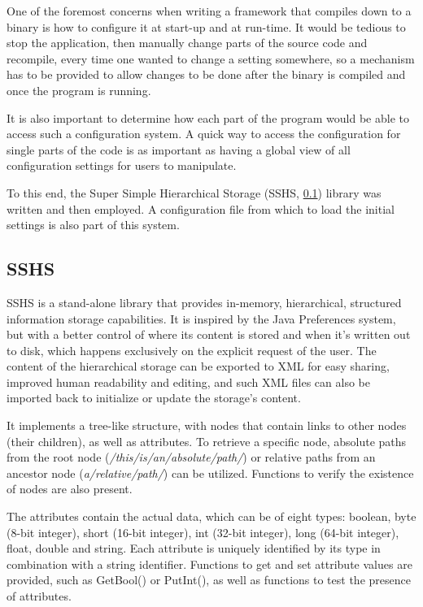 \documentclass[a4paper,12pt]{report}
\begin{document}
One of the foremost concerns when writing a framework that compiles down to a binary is how to configure it at start-up and at run-time. It would be tedious to stop the application, then manually change parts of the source code and recompile, every time one wanted to change a setting somewhere, so a mechanism has to be provided to allow changes to be done after the binary is compiled and once the program is running.

It is also important to determine how each part of the program would be able to access such a configuration system. A quick way to access the configuration for single parts of the code is as important as having a global view of all configuration settings for users to manipulate.

To this end, the Super Simple Hierarchical Storage (SSHS, \ref{subsec:sshs}) library was written and then employed. A configuration file from which to load the initial settings is also part of this system.

\subsection{SSHS} \label{subsec:sshs}

SSHS is a stand-alone library that provides in-memory, hierarchical, structured information storage capabilities.
It is inspired by the Java Preferences system, but with a better control of where its content is stored and when it's written out to disk, which happens exclusively on the explicit request of the user.
The content of the hierarchical storage can be exported to XML for easy sharing, improved human readability and editing, and such XML files can also be imported back to initialize or update the storage's content.

It implements a tree-like structure, with nodes that contain links to other nodes (their children), as well as attributes.
To retrieve a specific node, absolute paths from the root node (\emph{/this/is/an/absolute/path/}) or relative paths from an ancestor node (\emph{a/relative/path/}) can be utilized. Functions to verify the existence of nodes are also present.

The attributes contain the actual data, which can be of eight types: boolean, byte (8-bit integer), short (16-bit integer), int (32-bit integer), long (64-bit integer), float, double and string.
Each attribute is uniquely identified by its type in combination with a string identifier.
Functions to get and set attribute values are provided, such as GetBool() or PutInt(), as well as functions to test the presence of attributes.
\end{document}
